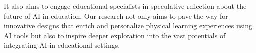 \documentclass[sn-mathphys, Numbered]{sn-jnl}%
\theoremstyle{thmstyleone}%
\theoremstyle{thmstyletwo}%
\theoremstyle{thmstylethree}%
\begin{document}

It also aims to engage educational specialists in speculative reflection about the future of AI in education. Our research not only aims to pave the way for innovative designs that enrich and personalize physical learning experiences using AI tools but also to inspire deeper exploration into the vast potentials of integrating AI in educational settings. 








\end{document}
